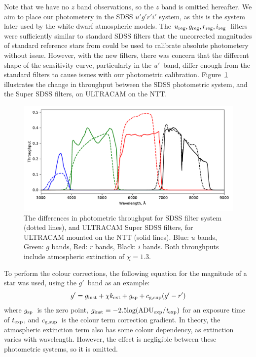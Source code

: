 Note that we have no $z$ band observations, so the $z$ band is omitted hereafter.
We aim to place our photometery in the SDSS $u'g'r'i'$ system, as this is the system later used by the white dwarf atmospheric models. The $u_{\rm reg}, g_{\rm reg}, r_{\rm reg}, i_{\rm reg}$\ filters were sufficiently similar to standard SDSS filters that the uncorrected magnitudes of standard reference stars from \citet{smith2002} could be used to calibrate absolute photometery without issue. However, with the new filters, there was concern that the different shape of the sensitivity curve, particularly in the $u'$\ band, differ enough from the standard filters to cause issues with our photometric calibration. Figure~\ref{fig:sdss vs super filters} illustrates the change in throughput between the SDSS photometric system, and the Super SDSS filters, on ULTRACAM on the NTT. 
\begin{figure}
    \centering
    \includegraphics[width=\columnwidth]{figures/three_cvs_with_weird_colours/GeneralFigs/bandpass_diffs_SDSS_dots_UCAMNTT_solid.pdf}
    \caption{The differences in photometric throughput for SDSS filter system (dotted lines), and ULTRACAM Super SDSS filters, for ULTRACAM mounted on the NTT (solid lines). Blue: $u$ bands, Green: $g$ bands, Red: $r$ bands, Black: $i$ bands. Both throughputs include atmospheric extinction of $\chi = 1.3$.}
    \label{fig:sdss vs super filters}
\end{figure}

To perform the colour corrections, the following equation for the magnitude of a star was used, using the $g'$\ band as an example:
\begin{equation}
    \label{eqn:gen magnitudes}
    g' = g_{\rm inst} + \chi k_{\rm ext} + g_{\rm zp} + c_{\rm g, sup}(g'-r') 
\end{equation}
where $g_{\rm zp}$\ is the zero point, $g_{\rm inst} = -2.5 \rm log(ADU_{\rm exp}/{\it t}_{\rm exp})$
for an exposure time of $t_{\rm exp}$, and $c_{\rm g, sup}$\ is the colour term correction gradient. In theory, the atmospheric extinction term also has some colour dependency, as extinction varies with wavelength. However, the effect is negligible between these photometric systems, so it is omitted.


